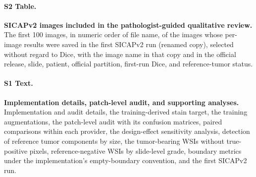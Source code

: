 \documentclass[10pt,letterpaper]{article}
\begin{document}
\paragraph*{S2 Table.}
\label{S2_Table}
{\bf SICAPv2 images included in the pathologist-guided qualitative review.} The first 100 images, in numeric order of file name, of the images whose per-image results were saved in the first SICAPv2 run (renamed copy), selected without regard to Dice, with the image name in that copy and in the official release, slide, patient, official partition, first-run Dice, and reference-tumor status.

\paragraph*{S1 Text.}
\label{S1_Appendix}
{\bf Implementation details, patch-level audit, and supporting analyses.} Implementation and audit details, the training-derived stain target, the training augmentations, the patch-level audit with its confusion matrices, paired comparisons within each provider, the design-effect sensitivity analysis, detection of reference tumor components by size, the tumor-bearing WSIs without true-positive pixels, reference-negative WSIs by slide-level grade, boundary metrics under the implementation's empty-boundary convention, and the first SICAPv2 run.
\end{document}
